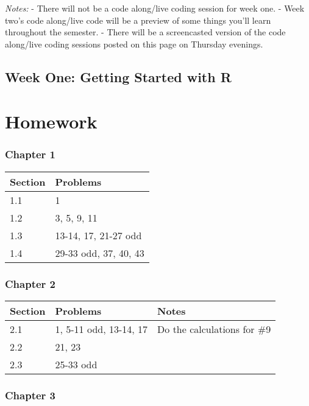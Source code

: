 \documentclass[
]{book}
\begin{document}
\emph{Notes:}
- There will not be a code along/live coding session for week one.
- Week two's code along/live code will be a preview of some things you'll learn throughout the semester.
- There will be a screencasted version of the code along/live coding sessions posted on this page on Thursday evenings.

\hypertarget{week-one-getting-started-with-r}{%
\section{Week One: Getting Started with R}\label{week-one-getting-started-with-r}}

\hypertarget{hw}{%
\chapter{Homework}\label{hw}}

\hypertarget{chapter-1-1}{%
\subsection{Chapter 1}\label{chapter-1-1}}

\begin{tabular}{l|l}
\hline
Section & Problems\\
\hline
1.1 & 1\\
\hline
1.2 & 3, 5, 9, 11\\
\hline
1.3 & 13-14, 17, 21-27 odd\\
\hline
1.4 & 29-33 odd, 37, 40, 43\\
\hline
\end{tabular}

\hypertarget{chapter-2-1}{%
\subsection{Chapter 2}\label{chapter-2-1}}

\begin{tabular}{l|l|l}
\hline
Section & Problems & Notes\\
\hline
2.1 & 1, 5-11 odd, 13-14, 17 & Do the calculations for \#9\\
\hline
2.2 & 21, 23 & \\
\hline
2.3 & 25-33 odd & \\
\hline
\end{tabular}

\hypertarget{chapter-3-1}{%
\subsection{Chapter 3}\label{chapter-3-1}}
\end{document}
